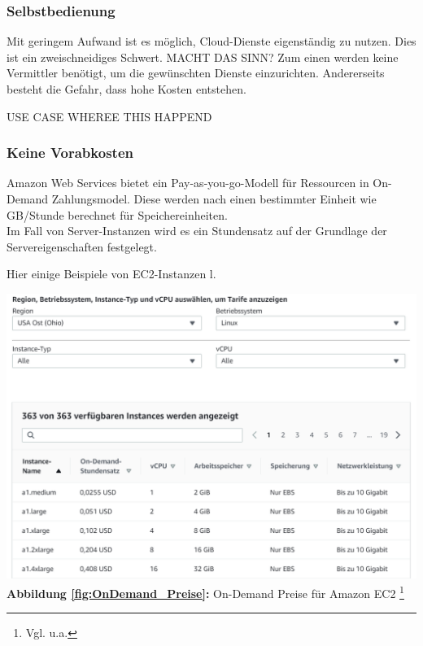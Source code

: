 \subsubsection{Selbstbedienung}
Mit geringem Aufwand ist es möglich, Cloud-Dienste eigenständig zu nutzen. Dies ist ein zweischneidiges Schwert.
MACHT DAS SINN?
Zum einen werden keine Vermittler benötigt, um die gewünschten Dienste einzurichten. Andererseits besteht die Gefahr, dass hohe Kosten entstehen.

USE CASE WHEREE THIS HAPPEND

\subsubsection{Keine Vorabkosten}
Amazon Web Services bietet ein Pay-as-you-go-Modell für Ressourcen in On-Demand Zahlungsmodel.
Diese werden nach einen bestimmter Einheit wie GB/Stunde berechnet für Speichereinheiten.
\\
Im Fall von Server-Instanzen wird es ein Stundensatz auf der Grundlage der Servereigenschaften festgelegt.

Hier einige Beispiele von EC2-Instanzen l.

\begin{center}
      \includegraphics[scale=0.4]{sources/On-Demand-Pläne für Amazon EC2}\label{fig:OnDemand_Preise}\\
      \textbf{Abbildung \autoref{fig:OnDemand_Preise}:} On-Demand Preise für Amazon EC2
      \footnote{Vgl. u.a.\cite{AMZ01}}
\end{center}

